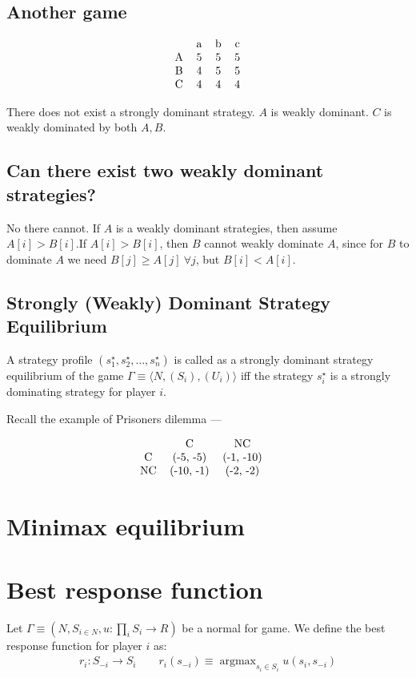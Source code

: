 \documentclass[11pt]{book}
\DeclareMathOperator*{\argmax}{argmax} %
\begin{document}
\subsection{Another game}
$$
\begin{tabular}{ccccc}
      & a & b & c \\
    A & 5 & 5 & 5 \\
    B & 4 & 5 & 5\\
    C & 4 & 4 & 4
\end{tabular}
$$

There does not exist a strongly dominant strategy.
$A$ is weakly dominant. $C$ is weakly dominated by both $A, B$.

\subsection{Can there exist two weakly dominant strategies?}
No there cannot. If $A$ is a weakly dominant strategies, then
assume $A[i] > B[i]$.If $A[i] > B[i]$, then $B$ cannot weakly dominate 
$A$, since for $B$ to dominate $A$ we need $B[j] \geq A[j]~ \forall j$,
but $B[i] < A[i]$.


\subsection{Strongly (Weakly) Dominant Strategy Equilibrium}
A strategy profile $(s_1^\star, s_2^\star, \dots, s_n^\star)$ is called as a strongly
dominant strategy equilibrium of the game $\Gamma \equiv \langle N, (S_i), (U_i) \rangle$ iff
the strategy $s_i^\star$ is a strongly dominating strategy for player $i$.

Recall the example of Prisoners dilemma ---

$$
\begin{tabular}{ccccc}
     & C & NC & \\
    C & (-5, -5) & (-1, -10) \\ 
    NC &  (-10, -1) & (-2, -2)
\end{tabular}
$$

\section{Minimax equilibrium}



\section{Best response function}
Let $\Gamma \equiv (N, S_{i \in N}, u: \prod_i S_i \rightarrow R)$ be a normal
for game. We define the best response function for player $i$ as:
\begin{align*}
   r_i: S_{-i} \rightarrow S_i
    \qquad r_i(s_{-i}) \equiv \argmax_{s_i \in S_i}  u(s_i, s_{-i})
\end{align*}
\end{document}
